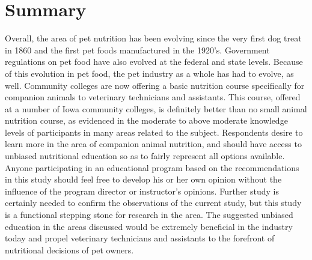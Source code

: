 \section{Summary}
 Overall, the area of pet nutrition has been evolving since the very first dog treat in 1860 and the first pet foods manufactured in the 1920's\citep{tudor}. Government regulations on pet food have also evolved at the federal and state levels\citep{fda,hillestad}. Because of this evolution in pet food, the pet industry as a whole has had to evolve, as well. Community colleges are now offering a basic nutrition course specifically for companion animals to veterinary technicians and assistants\citep{kcc}. This course, offered at a number of Iowa community colleges, is definitely better than no small animal nutrition course, as evidenced in the moderate to above moderate knowledge levels of participants in many areas related to the subject. Respondents desire to learn more in the area of companion animal nutrition, and should have access to unbiased nutritional education so as to fairly represent all options available. Anyone participating in an educational program based on the recommendations in this study should feel free to develop his or her own opinion without the influence of the program director or instructor's opinions. Further study is certainly needed to confirm the observations of the current study, but this study is a functional stepping stone for research in the area. The suggested unbiased education in the areas discussed would be extremely beneficial in the industry today and propel veterinary technicians and assistants to the forefront of nutritional decisions of pet owners.